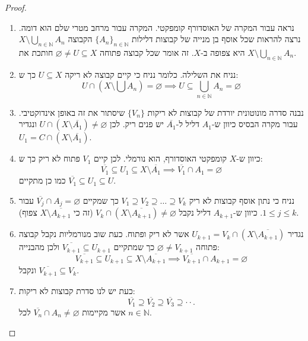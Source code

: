 \documentclass{tstextbook}
\begin{document}
\begin{proof}
  \begin{enumerate}
    \item נראה עבור המקרה של האוסדורף קומפקטי. המקרה עבור מרחב מטרי שלם הוא דומה. נרצה להראות שכל אוסף בן מנייה של קבוצות דלילות \(\{ A_{n} \}_{n \in \mathbb{N}}\) הקבוצה \(X \setminus \bigcup_{n \in \mathbb{N}}A_{n}\) היא צפופה ב-\(X\). זה אומר שכל קבוצה פתוחה \(\varnothing \neq U\subseteq X\) חותכת את \(X\setminus \bigcup_{n \in \mathbb{N}}A_{n}\).  


    \item נניח את השלילה. כלומר נניח כי קיים קבוצה לא ריקה \(U\subseteq X\) כך ש: 
$$U\cap\left(X\setminus\bigcup A_{n}\right)=\varnothing \implies U\subseteq \bigcup_{n \in \mathbb{N}} A_{n}= \varnothing $$


    \item נבנה סדרה מונוטונית יורדת של קבוצות לא ריקות \(\{ V_{n} \}\) שיסתור את זה באופן אינדוקטיבי. עבור מקרה הבסיס כיוון ש-\(A_{1}\) דליל ל-\(\overline{A_{1}}\) יש פנים ריק. לכן \(U\cap \left( X \setminus  \overline{A_{1}}  \right)\neq \varnothing\) ונגדיר \(U_{1}=C\cap \left( X \setminus \overline{A_{1}} \right)\). 


    \item כיוון ש-\(X\) קומפקטי האוסדורף, הוא נורמלי. לכן קיים \(V_{1}\) פתוח לא ריק כך ש: 
$$\overline{{{V_{1}}}}\subseteq U_{1}\subseteq X\setminus\overline{{{A_{1}}}}\implies\overline{{{V_{1}}}}\cap A_{1}=\varnothing$$
כמו כן מתקיים \(\overline{V_{1}}\subseteq U_{1}\subseteq U\).


    \item נניח כי נתון אוסף קבוצות לא ריק \(V_{1}\supseteq V_{2} \supseteq \dots \supseteq V_{k}\) כך שמקיים \(\overline{V_{j}}\cap A_{j}=\varnothing\) עבור \(1\leq j\leq k\). כיוון ש-\(A_{k+1}\) דליל נקבל \(V_{k}\cap\left(X\setminus{\overline{{A_{k+1}}}}\right)\neq \varnothing\) (זה כי \(X\setminus \overline{A_{k+1}}\) צפוף). 


    \item נגדיר \(U_{k+1}=V_{k}\cap \left( X \setminus \overline{A_{k+1}} \right)\) אשר לא ריק ופתוח. כעת שוב מנורמליות נקבל קבוצה פתוחה \(\varnothing\neq V_{k+1}\) כך שמתקיים \({\overline{{V_{k+1}}}}\subseteq U_{k+1}\) ולכן מהבנייה: 
$$\overline{{{V_{k+1}}}}\subseteq U_{k+1}\subseteq X\setminus\overline{{{A_{k+1}}}}\implies\overline{{{V_{k+1}}}}\cap A_{k+1}=\varnothing $$
ונקבל \(\overline{V_{k+1}}\subseteq V_{k}\).


    \item כעת יש לנו סדרת קבוצות לא ריקות: 
$$\overline{{{V_{1}}}}\supseteq\overline{{{V_{2}}}}\supseteq\overline{{{V_{3}}}}\supseteq\cdot\cdot.$$
אשר מקיימות \(\overline{V_{n}}\cap A_{n}\neq \varnothing\) לכל \(n \in \mathbb{N}\).



\end{enumerate}
\end{proof}
\end{document}
